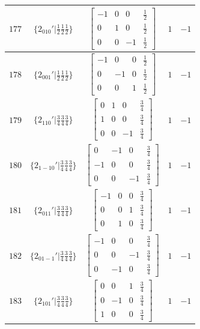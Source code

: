\documentclass[fleqn,8pt]{jsarticle}
\begin{document}
\begin{longtable}{ccccc}
$ 177 $ & $ \{2{}_{010}{}'|\frac{1}{2} \frac{1}{2} \frac{1}{2}\} $ & $ \begin{bmatrix} -1 & 0 & 0 & \frac{1}{2} \\ 0 & 1 & 0 & \frac{1}{2} \\ 0 & 0 & -1 & \frac{1}{2} \end{bmatrix} $ & $ 1 $ & $ -1 $ \\ \hline
$ 178 $ & $ \{2{}_{001}{}'|\frac{1}{2} \frac{1}{2} \frac{1}{2}\} $ & $ \begin{bmatrix} -1 & 0 & 0 & \frac{1}{2} \\ 0 & -1 & 0 & \frac{1}{2} \\ 0 & 0 & 1 & \frac{1}{2} \end{bmatrix} $ & $ 1 $ & $ -1 $ \\ \hline
$ 179 $ & $ \{2{}_{110}{}'|\frac{3}{4} \frac{3}{4} \frac{3}{4}\} $ & $ \begin{bmatrix} 0 & 1 & 0 & \frac{3}{4} \\ 1 & 0 & 0 & \frac{3}{4} \\ 0 & 0 & -1 & \frac{3}{4} \end{bmatrix} $ & $ 1 $ & $ -1 $ \\ \hline
$ 180 $ & $ \{2{}_{1-10}{}'|\frac{3}{4} \frac{3}{4} \frac{3}{4}\} $ & $ \begin{bmatrix} 0 & -1 & 0 & \frac{3}{4} \\ -1 & 0 & 0 & \frac{3}{4} \\ 0 & 0 & -1 & \frac{3}{4} \end{bmatrix} $ & $ 1 $ & $ -1 $ \\ \hline
$ 181 $ & $ \{2{}_{011}{}'|\frac{3}{4} \frac{3}{4} \frac{3}{4}\} $ & $ \begin{bmatrix} -1 & 0 & 0 & \frac{3}{4} \\ 0 & 0 & 1 & \frac{3}{4} \\ 0 & 1 & 0 & \frac{3}{4} \end{bmatrix} $ & $ 1 $ & $ -1 $ \\ \hline
$ 182 $ & $ \{2{}_{01-1}{}'|\frac{3}{4} \frac{3}{4} \frac{3}{4}\} $ & $ \begin{bmatrix} -1 & 0 & 0 & \frac{3}{4} \\ 0 & 0 & -1 & \frac{3}{4} \\ 0 & -1 & 0 & \frac{3}{4} \end{bmatrix} $ & $ 1 $ & $ -1 $ \\ \hline
$ 183 $ & $ \{2{}_{101}{}'|\frac{3}{4} \frac{3}{4} \frac{3}{4}\} $ & $ \begin{bmatrix} 0 & 0 & 1 & \frac{3}{4} \\ 0 & -1 & 0 & \frac{3}{4} \\ 1 & 0 & 0 & \frac{3}{4} \end{bmatrix} $ & $ 1 $ & $ -1 $ \\ \hline

\end{longtable}
\end{document}
